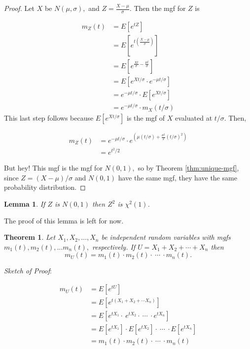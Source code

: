 \documentclass[
]{book}
\newtheorem{theorem}{Theorem}[chapter]
\newtheorem{lemma}{Lemma}[chapter]
\theoremstyle{definition}
\theoremstyle{definition}
\theoremstyle{definition}
\theoremstyle{definition}
\theoremstyle{remark}
\begin{document}
\begin{proof}
Let \(X\) be \(N(\mu,\sigma),\) and \(Z = \frac{X-\mu}{\sigma}\). Then the mgf for \(Z\) is

\begin{align*}
m_Z(t) &= E\left[e^{tZ}\right]\\
      &= E\left[e^{t\left(\frac{X-\mu}{\sigma}\right)}\right]\\
      &= E\left[e^{\frac{Xt}{\sigma} - \frac{\mu t}{\sigma}}\right]\\
      &= E\left[e^{Xt/\sigma} \cdot e^{-\mu t/\sigma}\right] \\
      &= e^{-\mu t/\sigma}\cdot E\left[e^{Xt/\sigma}\right]\\
      &= e^{-\mu t/\sigma}\cdot m_X(t/\sigma)
\end{align*}
This last step follows because \(\displaystyle E\left[e^{Xt/\sigma}\right]\) is the mgf of \(X\) evaluated at \(t/\sigma\). Then,

\begin{align*}
m_Z(t) &= e^{-\mu t/\sigma}\cdot e^{\left(\mu (t/\sigma) + \frac{\sigma^2}{2}(t/\sigma)^2\right)} \\
      &= e^{t^2/2}
\end{align*}

But hey! This mgf is the mgf for \(N(0,1),\) so by Theorem \ref{thm:unique-mgf}, since \(Z = (X-\mu)/\sigma\) and \(N(0,1)\) have the same mgf, they have the same probability distribution.
\end{proof}

\begin{lemma}
\protect\hypertarget{lem:Z-square-is-chi-square}{}\label{lem:Z-square-is-chi-square}If \(Z\) is \(N(0,1)\) then \(Z^2\) is \(\chi^2(1)\).
\end{lemma}

The proof of this lemma is left for now.

\begin{theorem}
\protect\hypertarget{thm:mgf-sum-of-rvs}{}\label{thm:mgf-sum-of-rvs}Let \(X_1, X_2, \ldots, X_n\) be independent random variables with mgfs \(m_1(t), m_2(t), \ldots m_n(t),\) respectively. If \(U = X_1 + X_2 + \cdots + X_n\) then \[m_U(t) = m_1(t) \cdot m_2(t) \cdot ~\cdots~ \cdot m_n(t).\]
\end{theorem}

\emph{Sketch of Proof}:

\begin{align*}
m_U(t) &= E\left[e^{tU}\right]\\
      &= E\left[e^{t(X_1 + X_2 + \cdots X_n)}\right]\\
      &= E\left[e^{tX_1}\cdot\ e^{tX_2} \cdot ~\cdots~ \cdot e^{tX_n}\right]\\
      &= E\left[e^{tX_1}\right] \cdot E\left[e^{tX_2}\right] \cdot ~\cdots~ \cdot E\left[e^{tX_n}\right]\\
      &= m_1(t) \cdot m_2(t) \cdot ~\cdots~ \cdot m_n(t)
\end{align*}
\end{document}
